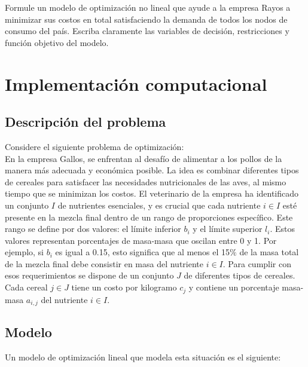 \documentclass[addpoints,10pt]{exam}
\begin{document}
\begin{questions}
Formule un modelo de optimización no lineal que ayude a la empresa Rayos a minimizar sus costos en total satisfaciendo la demanda de todos los nodos de consumo del país. Escriba claramente las variables de decisión, restricciones y función objetivo del modelo.\\

\newpage
    \question[20]
    \section{Implementación computacional}
\subsection{Descripción del problema}
Considere el siguiente problema de optimización: \\
En la empresa Gallos, se enfrentan al desafío de alimentar a los pollos de la manera más adecuada y económica posible. La idea es combinar diferentes tipos de cereales para satisfacer las necesidades nutricionales de las aves, al mismo tiempo que se minimizan los costos. El veterinario de la empresa ha identificado un conjunto $I$ de nutrientes esenciales, y es crucial que cada nutriente $i \in I$ esté presente en la mezcla final dentro de un rango de proporciones específico. Este rango se define por dos valores: el límite inferior $b_i$ y el límite superior $l_i$. Estos valores representan porcentajes de masa-masa que oscilan entre 0 y 1. Por ejemplo, si $b_i$ es igual a 0.15, esto significa que al menos el 15$\%$ de la masa total de la mezcla final debe consistir en masa del nutriente $i \in I$. Para cumplir con esos requerimientos se dispone de un conjunto $J$ de diferentes tipos de cereales. Cada cereal $j \in J$ tiene un costo por kilogramo $c_j$ y contiene un porcentaje masa-masa $a_{i,j}$ del nutriente $i \in I$.

\subsection{Modelo}
Un modelo de optimización lineal que modela esta situación es el siguiente:\\


\end{questions}
\end{document}
